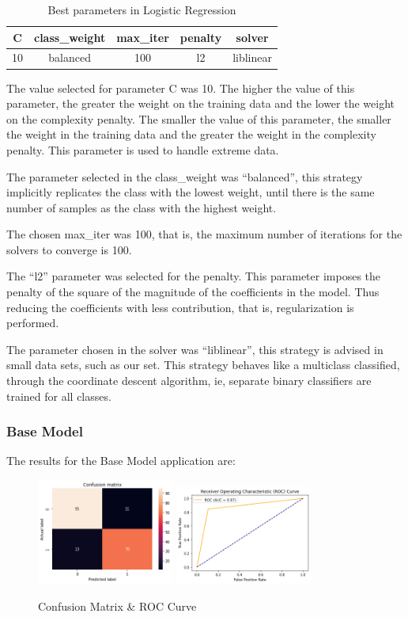 \documentclass[conference]{IEEEtran}
\begin{document}
\begin{table}[ht]
    \centering
    \caption{Best parameters in Logistic Regression} 
    \begin{tabular}{||c c c c c||} 
     \hline
     C & class\_weight & max\_iter & penalty & solver \\ [0.5ex] 
     \hline\hline
     10 & balanced & 100 & l2 & liblinear \\ 
    \hline
    \end{tabular}
    \label{tab:tab1}
\end{table}

The value selected for parameter C was 10. The higher the value of this parameter, the greater the weight on the training data and the lower the weight on the complexity penalty. The smaller the value of this parameter, the smaller the weight in the training data and the greater the weight in the complexity penalty. This parameter is used to handle extreme data. 

The parameter selected in the class\_weight was “balanced”, this strategy implicitly replicates the class with the lowest weight, until there is the same number of samples as the class with the highest weight.

The chosen max\_iter was 100, that is, the maximum number of iterations for the solvers to converge is 100.

The “l2” parameter was selected for the penalty. This parameter imposes the penalty of the square of the magnitude of the coefficients in the model. Thus reducing the coefficients with less contribution, that is, regularization is performed.

The parameter chosen in the solver was “liblinear”, this strategy is advised in small data sets, such as our set. This strategy behaves like a multiclass classified, through the coordinate descent algorithm, ie, separate binary classifiers are trained for all classes.

\subsubsection{Base Model}
The results for the Base Model application are:

\begin{figure}[!h!]
    \includegraphics[width=4.5cm]{LogReg/lg1_1.png}%
    \includegraphics[width=4.5cm]{LogReg/lg1_2.png}%
    \caption{Confusion Matrix & ROC Curve}%
    \label{fig:conf_LogReg_1}%
\end{figure}
\end{document}

